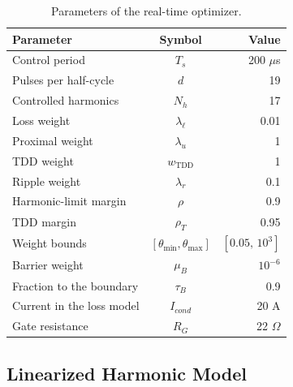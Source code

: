 \documentclass[conference]{IEEEtran}
\begin{document}
\begin{table}[!t]
    \centering
    \caption{Parameters of the real-time optimizer.}
    \bgroup
    \def\arraystretch{1.0}
    \setlength{\tabcolsep}{4pt}
    \begin{tabular*}{\columnwidth}{@{\extracolsep{\fill}}lcr@{}}
        \toprule
        \rowcolor{Gray}
        Parameter & Symbol & Value \\ \midrule
        Control period             & $T_s$                 & 200 $\mu$s \\
        Pulses per half-cycle      & $d$                   & 19 \\
        Controlled harmonics       & $N_h$                 & 17 \\
        Loss weight                & $\lambda_{\ell}$      & 0.01 \\
        Proximal weight            & $\lambda_u$           & 1 \\
        TDD weight                 & $w_{\mathrm{TDD}}$    & 1 \\
        Ripple weight              & $\lambda_r$           & 0.1 \\
        Harmonic-limit margin      & $\rho$                & 0.9 \\
        TDD margin                 & $\rho_T$              & 0.95 \\
        Weight bounds              & $[\theta_{\min},\theta_{\max}]$
                                   & $[0.05,\,10^3]$ \\
        Barrier weight             & $\mu_B$               & $10^{-6}$ \\
        Fraction to the boundary   & $\tau_B$              & 0.9 \\
        Current in the loss model  & $I_{cond}$            & 20 A \\
        Gate resistance            & $R_G$                 & 22 $\Omega$ \\
        \bottomrule
    \end{tabular*}
    \egroup
    \label{tab:rt_param}
\end{table}

\subsection{Linearized Harmonic Model}
\label{subsec:rt_lin}
\end{document}

